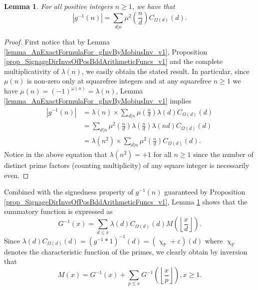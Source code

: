 \documentclass[11pt,reqno,a4letter]{article}
\numberwithin{figure}{section}
\numberwithin{table}{section}
\renewcommand{\chi}{\upchi}
\newcommand{\Floor}[2]{\ensuremath{\left\lfloor \frac{#1}{#2} \right\rfloor}}
\theoremstyle{plain}
\newtheorem{lemma}[theorem]{Lemma}
\numberwithin{theorem}{section}
\theoremstyle{definition}
\begin{document}
\begin{lemma} 
\label{lemma_AbsValueOf_gInvn_FornSquareFree_v1} 
For all positive integers $n \geq 1$, we have that 
\begin{equation} 
\label{eqn_AbsValueOf_gInvn_FornSquareFree_v1} 
|g^{-1}(n)| = \sum_{d|n} \mu^2\left(\frac{n}{d}\right) C_{\Omega(d)}(d). 
\end{equation} 
\end{lemma} 
\begin{proof} 
First notice that by 
Lemma \ref{lemma_AnExactFormulaFor_gInvByMobiusInv_v1}, 
Proposition \ref{prop_SignageDirInvsOfPosBddArithmeticFuncs_v1} and the 
complete multiplicativity of $\lambda(n)$, 
we easily obtain the stated result. 
In particular, since $\mu(n)$ is non-zero only at squarefree integers and 
at any squarefree $n \geq 1$ we have $\mu(n) = (-1)^{\omega(n)} = \lambda(n)$, 
Lemma \ref{lemma_AnExactFormulaFor_gInvByMobiusInv_v1} implies 
\begin{align*} 
|g^{-1}(n)| & = \lambda(n) \times \sum_{d|n} \mu\left(\frac{n}{d}\right) \lambda(d) C_{\Omega(d)}(d) \\ 
     & = \sum_{d|n} \mu^2\left(\frac{n}{d}\right) \lambda\left(\frac{n}{d}\right) 
     \lambda(nd) C_{\Omega(d)}(d) \\ 
     & = \lambda(n^2) \times \sum_{d|n} \mu^2\left(\frac{n}{d}\right) C_{\Omega(d)}(d). 
\end{align*} 
Notice in the above equation 
that $\lambda(n^2) = +1$ for all $n \geq 1$ since the number of distinct 
prime factors (counting multiplicity) of any square integer is necessarily even. 
\end{proof} 

Combined with the signedness property of $g^{-1}(n)$ guaranteed by 
Proposition \ref{prop_SignageDirInvsOfPosBddArithmeticFuncs_v1}, 
Lemma \ref{lemma_AbsValueOf_gInvn_FornSquareFree_v1} shows that the summatory 
function is expressed as 
\[
G^{-1}(x) = \sum_{d \leq x} \lambda(d) C_{\Omega(d)}(d) M\left(\Floor{x}{d}\right). 
\]
Since $\lambda(d) C_{\Omega(d)}(d) = (g^{-1} \ast 1)^{-1}(d) = (\chi_{\mathbb{P}} + \varepsilon)(d)$ 
where $\chi_{\mathbb{P}}$ denotes the characteristic function of the primes, we clearly 
obtain by inversion that 
\[
M(x) = G^{-1}(x) + \sum_{p \leq x} G^{-1}\left(\Floor{x}{p}\right), x \geq 1. 
\]
\end{document}
